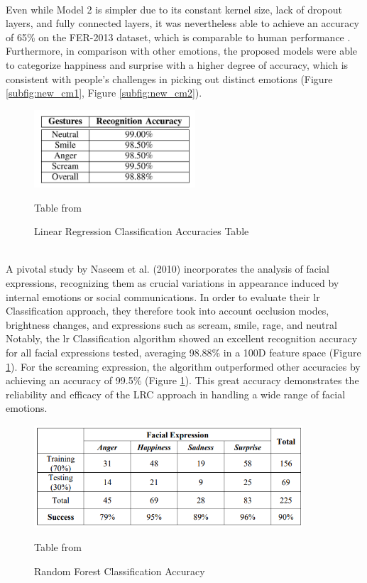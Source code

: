 \\
\indent Even while Model 2 is simpler due to its constant kernel size, lack of dropout layers, and fully connected layers, it was nevertheless able to achieve an accuracy of 65\% on the FER-2013 dataset, which is comparable to human performance \cite{agrawal_2019_using}.
Furthermore, in comparison with other emotions, the proposed models were able to categorize happiness and surprise with a higher degree of accuracy, which is consistent with people's challenges in picking out distinct emotions (Figure \ref{subfig:new_cm1}, Figure \ref{subfig:new_cm2}).
\\
\begin{figure}[!ht]
    \centering
    \includegraphics[width=6cm]{Images/lr_result.png}
    \caption{Linear Regression Classification Accuracies Table} \footnotesize{Table from \cite{naseem_2010_linear}}
    \label{fig:lrc_result}
\end{figure}
\\
\indent A pivotal study by Naseem et al. (2010) incorporates the analysis of facial expressions, recognizing them as crucial variations in appearance induced by internal emotions or social communications.
In order to evaluate their \gls{lr} Classification approach, they therefore took into account occlusion modes, brightness changes, and expressions such as scream, smile, rage, and neutral
Notably, the \gls{lr} Classification algorithm showed an excellent recognition accuracy for all facial expressions tested, averaging 98.88\% in a 100D feature space (Figure \ref{fig:lrc_result}). 
For the screaming expression, the algorithm outperformed other accuracies by achieving an accuracy of 99.5\% (Figure \ref{fig:lrc_result}).
This great accuracy demonstrates the reliability and efficacy of the LRC approach in handling a wide range of facial emotions.
\\
\begin{figure}[!ht]
    \centering
    \includegraphics[width=10cm]{Images/rf_result.png}
    \caption{Random Forest Classification Accuracy} \footnotesize{Table from \cite{munasinghe_2018_facial}}
    \label{fig:rf_result}
\end{figure}
